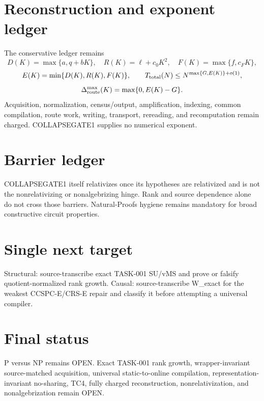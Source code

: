 \documentclass[11pt]{article}
\begin{document}
\section*{Reconstruction and exponent ledger}
The conservative ledger remains
\[
D(K)=\max\{a,q+bK\},\quad R(K)=\ell+c_0K^2,\quad F(K)=\max\{f,c_FK\},
\]
\[
E(K)=\min\{D(K),R(K),F(K)\},\qquad T_{\rm total}(N)\le N^{\max\{G,E(K)\}+o(1)},
\]
\[
\Delta_{\rm route}^{\max}(K)=\max\{0,E(K)-G\}.
\]
Acquisition, normalization, census/output, amplification, indexing, common compilation, route work, writing, transport, rereading, and recomputation remain charged. COLLAPSEGATE1 supplies no numerical exponent.

\section*{Barrier ledger}
COLLAPSEGATE1 itself relativizes once its hypotheses are relativized and is not the nonrelativizing or nonalgebrizing hinge. Rank and source dependence alone do not cross those barriers. Natural-Proofs hygiene remains mandatory for broad constructive circuit properties.

\section*{Single next target}
Structural: source-transcribe exact TASK-001 SU/vMS and prove or falsify quotient-normalized rank growth. Causal: source-transcribe W_exact for the weakest CCSPC-E/CRS-E repair and classify it before attempting a universal compiler.

\section*{Final status}
P versus NP remains OPEN. Exact TASK-001 rank growth, wrapper-invariant source-matched acquisition, universal static-to-online compilation, representation-invariant no-sharing, TC4, fully charged reconstruction, nonrelativization, and nonalgebrization remain OPEN.

\end{document}

